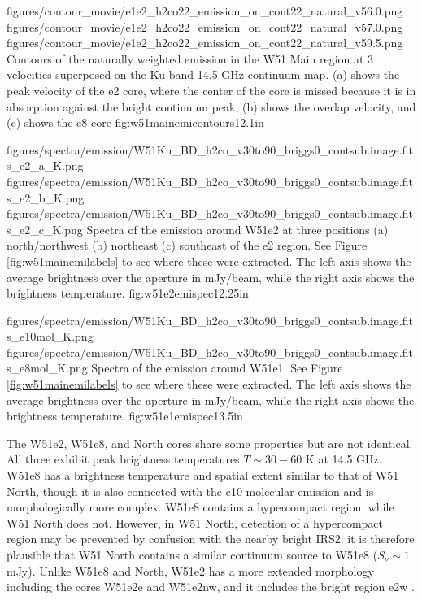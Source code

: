 \FigureThreeAA
{figures/contour_movie/e1e2_h2co22_emission_on_cont22_natural_v56.0.png}
{figures/contour_movie/e1e2_h2co22_emission_on_cont22_natural_v57.0.png}
{figures/contour_movie/e1e2_h2co22_emission_on_cont22_natural_v59.5.png}
{Contours of the \formaldehyde \twotwo naturally weighted emission in the W51
Main region at 3 velocities superposed on the Ku-band 14.5 GHz continuum map.
(a) shows the peak velocity of the e2 core, where the center of the core is
missed because it is
in absorption against the bright continuum peak, (b) shows the overlap
velocity, and
(c) shows the e8 core}
{fig:w51mainemicontours}{1}{2.1in}

\FigureThreeAA
{figures/spectra/emission/W51Ku_BD_h2co_v30to90_briggs0_contsub.image.fits_e2_a_K.png}
{figures/spectra/emission/W51Ku_BD_h2co_v30to90_briggs0_contsub.image.fits_e2_b_K.png}
{figures/spectra/emission/W51Ku_BD_h2co_v30to90_briggs0_contsub.image.fits_e2_c_K.png}
{Spectra of the \twotwo emission around W51e2 at three positions (a)
north/northwest (b) northeast (c) southeast of the e2 \hchii region.  See Figure
\ref{fig:w51mainemilabels} to see where these were extracted.  The left axis
shows the average brightness over the aperture in mJy/beam, while the right axis
shows the brightness temperature.}
{fig:w51e2emispec}{1}{2.25in}

\FigureTwoAA
{figures/spectra/emission/W51Ku_BD_h2co_v30to90_briggs0_contsub.image.fits_e10mol_K.png}
{figures/spectra/emission/W51Ku_BD_h2co_v30to90_briggs0_contsub.image.fits_e8mol_K.png}
{Spectra of the \twotwo emission around W51e1.  See Figure
\ref{fig:w51mainemilabels} to see where these were extracted.  The left axis
shows the average brightness over the aperture in mJy/beam, while the right axis
shows the brightness temperature.
}
{fig:w51e1emispec}{1}{3.5in}



The W51e2, W51e8, and North cores share some properties but are not identical.
All three exhibit peak \formaldehyde \twotwo brightness temperatures
$T\sim30-60$ K at 14.5 GHz.  W51e8 has a
brightness temperature and spatial extent similar to that of W51 North, though
it is also connected with the e10 molecular emission and is morphologically
more complex.  W51e8 contains a hypercompact \hii region, while W51 North does
not.  However, in W51 North, detection of a hypercompact \hii region may be prevented by
confusion with the nearby bright IRS2: it is therefore plausible that
W51 North contains a similar continuum source to W51e8 ($S_\nu \sim 1$ mJy).
Unlike W51e8 and North, W51e2 has a more extended morphology including
the cores W51e2e and W51e2nw, and it includes the bright \hchii region e2w
\citep{Shi2010a,Goddi2016a}.

